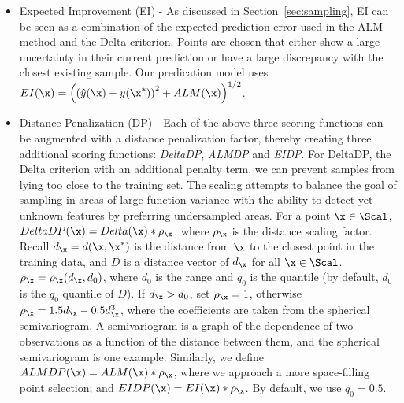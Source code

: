 \begin{itemize}
\item{Expected Improvement (EI) - As discussed in Section~\ref{sec:sampling}, EI can be seen as a combination of the expected prediction error used in the ALM method and the Delta criterion.
%
Points are chosen that either show a large uncertainty in their current prediction or have a large discrepancy with the closest existing sample.
%
Our predication model uses $EI(\x) = \left(\left(\hat{y}(\x) - y(\x^*)\right)^2+ ALM(\x)\right)^{1/2}$.}

\item{Distance Penalization (DP) - Each of the above three scoring functions can be augmented with a distance penalization factor, thereby creating three additional scoring functions: \emph{DeltaDP}, \emph{ALMDP} and \emph{EIDP}.
%
For DeltaDP, the Delta criterion with an additional penalty term, we can prevent samples from lying too close to the training set.
%
The scaling attempts to balance the goal of sampling in areas of large function variance with the ability to detect yet unknown features by preferring undersampled areas.
%
For a point $\x \in \Scal$, $DeltaDP(\x) = Delta(\x) * \rho_\x$, where $\rho_\x$ is the distance scaling factor.
%
Recall $d_\x = d(\x,\x^*)$ is the distance from $\x$ to the closest point in the training data, and $D$ is a distance vector of $d_\x$ for all $\x \in \Scal$.
%
$\rho_\x = \rho_\x (d_\x, d_0)$, where $d_0$ is the range and $q_0$ is the quantile (by default, $d_0$ is the $q_0$ quantile of $D$).
%
If $d_\x>d_0$, set $\rho_\x = 1$, otherwise $\rho_\x = 1.5d_\x-0.5d_\x^3$, where the coefficients are taken from the spherical semivariogram.
%
A semivariogram is a graph of the dependence of two observations as a function of the distance between them, and the spherical semivariogram is one example.
%
Similarly, we define $ALMDP(\x) = ALM(\x) * \rho_\x$, where we approach a more space-filling point selection; and $EIDP(\x) = EI(\x) * \rho_\x$.
%
By default, we use $q_0 = 0.5$.}
\end{itemize}

